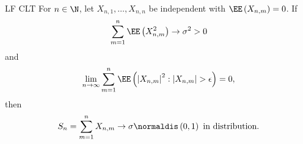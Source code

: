 \documentclass[stat901]{subfiles}
\begin{document}
    \begin{theorem}{LF CLT}
        For $n\in\N$, let $X_{n,1},\ldots,X_{n,n}$ be independent with $\EE\left( X_{n,m} \right) = 0$. If
        \begin{equation*}
            \sum^{n}_{m=1} \EE\left( X^{2}_{n,m} \right) \to \sigma^{2} > 0
        \end{equation*}
        and
        \begin{equation*}
            \lim_{n\to\infty} \sum^{n}_{m=1} \EE\left( \left| X_{n,m} \right|^{2} : \left| X_{n,m} \right| > \epsilon \right) = 0,
        \end{equation*}
        then
        \begin{equation*}
            S_n = \sum^{n}_{m=1} X_{n,m} \to \sigma\normaldis\left( 0,1 \right)\text { in distribution}.
        \end{equation*}
    \end{theorem}

    \rruleline
    
    
    
    
    
    
    
    
    
    
    
    
    
    
    
    
    
    
    
    
    
    
    
    
    
    
    
    
    
    
    
    
    
    
    
    
    
    
\end{document}
